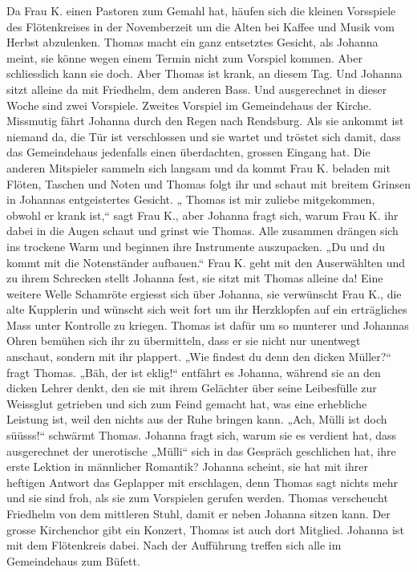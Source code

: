 Da Frau K. einen Pastoren zum Gemahl  hat, häufen sich die kleinen Vorsspiele des Flötenkreises  in der Novemberzeit um die Alten bei Kaffee und Musik vom Herbst abzulenken. Thomas macht ein ganz entsetztes Gesicht, als Johanna meint, sie könne wegen einem Termin nicht zum Vorspiel kommen. Aber schliesslich kann sie doch. Aber Thomas ist krank, an diesem Tag. Und Johanna sitzt alleine da mit Friedhelm, dem anderen Bass. Und ausgerechnet in dieser Woche sind zwei Vorspiele.
 Zweites Vorspiel im Gemeindehaus der Kirche. Missmutig fährt Johanna durch den Regen nach Rendsburg. Als sie ankommt ist niemand da, die Tür ist verschlossen und sie wartet und tröstet sich damit, dass das Gemeindehaus jedenfalls einen überdachten, grossen Eingang hat. Die anderen Mitspieler sammeln sich langsam und da kommt Frau K. beladen mit  Flöten, Taschen und Noten und Thomas folgt ihr und schaut mit breitem Grinsen in Johannas entgeistertes Gesicht. „ Thomas ist mir zuliebe mitgekommen, obwohl er krank ist,“ sagt Frau K., aber Johanna fragt sich, warum Frau K.  ihr dabei in die Augen schaut und grinst wie Thomas. Alle zusammen drängen sich ins trockene Warm und beginnen ihre Instrumente auszupacken. „Du und du kommt mit die Notenständer aufbauen.“ Frau K. geht mit den Auserwählten und zu ihrem Schrecken stellt Johanna fest, sie sitzt mit Thomas alleine da! Eine weitere Welle Schamröte ergiesst sich über Johanna, sie verwünscht Frau K., die alte Kupplerin und wünscht sich weit fort um ihr Herzklopfen auf ein erträgliches Mass unter Kontrolle zu kriegen. Thomas ist dafür um so munterer und Johannas Ohren bemühen sich ihr zu übermitteln, dass er sie nicht nur unentwegt anschaut, sondern mit ihr plappert. „Wie findest du denn den dicken Müller?“ fragt Thomas. „Bäh, der ist eklig!“ entfährt es Johanna, während sie an den dicken Lehrer denkt, den sie mit ihrem Gelächter über seine Leibesfülle zur Weissglut getrieben und sich zum Feind gemacht hat, was eine erhebliche Leistung ist, weil den nichts aus der Ruhe bringen kann. „Ach, Mülli ist doch süüsss!“ schwärmt Thomas. Johanna fragt sich, warum sie es verdient hat, dass ausgerechnet der unerotische „Mülli“ sich in das Gespräch geschlichen hat, ihre erste Lektion in männlicher Romantik? Johanna scheint, sie hat mit ihrer heftigen Antwort das Geplapper mit erschlagen, denn Thomas sagt nichts mehr  und sie sind froh, als sie zum Vorspielen gerufen werden. Thomas verscheucht Friedhelm von dem mittleren Stuhl, damit er neben Johanna sitzen kann.
Der grosse Kirchenchor gibt ein Konzert, Thomas ist auch dort Mitglied. Johanna ist mit dem Flötenkreis dabei. Nach der Aufführung treffen sich alle im Gemeindehaus zum Büfett.
